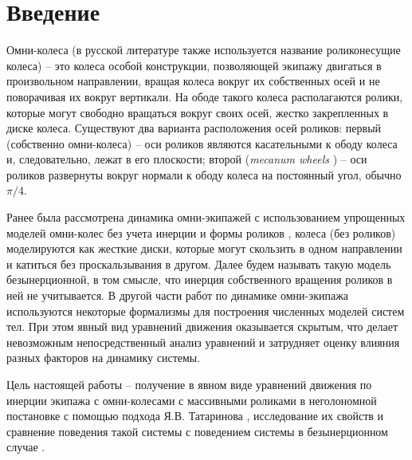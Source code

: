 \chapter*{Введение}

Омни-колеса (в русской литературе также используется название роликонесущие колеса) -- это колеса особой конструкции, позволяющей экипажу двигаться в произвольном направлении, вращая колеса вокруг их собственных осей и не поворачивая их вокруг вертикали. На ободе такого колеса располагаются ролики, которые могут свободно вращаться вокруг своих осей, жестко закрепленных в диске колеса. Существуют два варианта расположения осей роликов: первый  (собственно омни-колеса) -- оси роликов являются касательными к ободу колеса и, следовательно, лежат в его плоскости; второй (\textit{mecanum wheels} \cite{mecanum}) -- оси роликов развернуты вокруг нормали к ободу колеса на постоянный угол, обычно $\pi/4$.

Ранее была рассмотрена динамика омни-экипажей с использованием упрощенных моделей омни-колес без учета инерции и формы роликов \cite{ZobovaTatarinovPMM, formalskii, borisov, ZobovaTatarinovAspecty2006, zobova2008svobodnye8020851, Martynenko2010}, колеса (без роликов) моделируются как жесткие диски, которые могут скользить в одном направлении и катиться без проскальзывания в другом. Далее будем называть такую модель безынерционной, в том смысле, что инерция собственного вращения роликов в ней не учитывается. В другой части работ по динамике омни-экипажа \cite{KosenkoGerasimov, Tobolar, Williams2002, Ashmore2002} используются некоторые формализмы для построения численных моделей систем тел. При этом явный вид уравнений движения оказывается скрытым, что делает невозможным непосредственный  анализ уравнений и затрудняет оценку влияния разных факторов на динамику системы.


Цель настоящей работы -- получение в явном виде уравнений движения по инерции экипажа с омни-колесами с массивными роликами в неголономной постановке с помощью подхода Я.В. Татаринова \cite{Tatarinov}, исследование их свойств и сравнение поведения такой системы с поведением системы в безынерционном случае \cite{Zobova2011}.